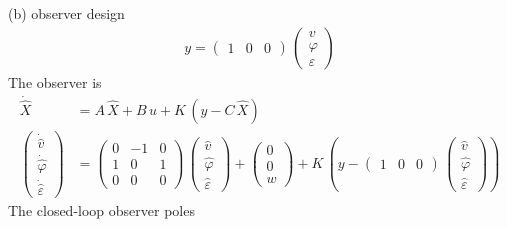 (b) observer design 
\begin{align*}
    y = \begin{pmatrix}
        1 & 0 & 0
    \end{pmatrix}\,\begin{pmatrix}
        v \\ \varphi \\ \varepsilon 
    \end{pmatrix}
\end{align*}
The observer is 
\begin{align*}
    \dot{\hat X} &= A\,\hat X + B\,u + K\,\left(y - C\,\hat X\right) \\
    \begin{pmatrix}
        \dot{\hat v} \\ \dot{\hat \varphi} \\ \dot{\hat \varepsilon}
    \end{pmatrix} &= \begin{pmatrix}
        0 & -1 & 0 \\ 1 & 0 & 1 \\ 0 & 0 & 0
    \end{pmatrix}\,\begin{pmatrix}
        \hat v \\ \hat \varphi \\ \hat \varepsilon
    \end{pmatrix} + \begin{pmatrix}
        0 \\ 0 \\ w
    \end{pmatrix} + K\,\left(y - \begin{pmatrix}
        1 & 0 & 0
    \end{pmatrix}\,\begin{pmatrix}
        \hat v \\ \hat \varphi \\ \hat \varepsilon
    \end{pmatrix}\right)
\end{align*}
The closed-loop observer poles 
